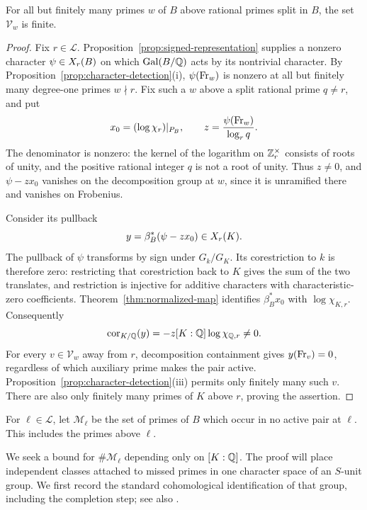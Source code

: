 \begin{lemma}\label{lem:finite-fibers}
For all but finitely many primes $w$ of $B$ above rational primes split in $B$, the set $\mathcal V_w$ is finite.
\end{lemma}
\begin{proof}
Fix $r\in\mathcal L$. Proposition~\ref{prop:signed-representation} supplies a nonzero character $\psi\in X_{r}(B)$ on which $\operatorname{Gal}(B/\mathbb Q)$ acts by its nontrivial character. By Proposition~\ref{prop:character-detection}(i), $\psi(\operatorname{Fr}_w)$ is nonzero at all but finitely many degree-one primes $w\nmid r$. Fix such a $w$ above a split rational prime $q\ne r$, and put
\[
 x_0=(\log\chi_r)|_{P_B},\qquad
 z=\frac{\psi(\operatorname{Fr}_w)}{\log_r q}.
\]
The denominator is nonzero: the kernel of the logarithm on $\mathbb Z_r^\times$ consists of roots of unity, and the positive rational integer $q$ is not a root of unity. Thus $z\ne0$, and $\psi-zx_0$ vanishes on the decomposition group at $w$, since it is unramified there and vanishes on Frobenius.

Consider its pullback
\[
 y=\beta_B^*(\psi-zx_0)\in X_{r}(K).
\]
The pullback of $\psi$ transforms by sign under $G_k/G_K$. Its corestriction to $k$ is therefore zero: restricting that corestriction back to $K$ gives the sum of the two translates, and restriction is injective for additive characters with characteristic-zero coefficients. Theorem~\ref{thm:normalized-map} identifies $\beta_B^*x_0$ with $\log\chi_{K,r}$. Consequently
\[
 \operatorname{cor}_{K/\mathbb Q}(y)
 =-z[K:\mathbb Q]\log\chi_{\mathbb Q,r}\ne0.
\]
For every $v\in\mathcal V_w$ away from $r$, decomposition containment gives $y(\operatorname{Fr}_v)=0$, regardless of which auxiliary prime makes the pair active. Proposition~\ref{prop:character-detection}(iii) permits only finitely many such $v$. There are also only finitely many primes of $K$ above $r$, proving the assertion.
\end{proof}

For $\ell\in\mathcal L$, let $\mathcal M_\ell$ be the set of primes of $B$ which occur in no active pair at $\ell$. This includes the primes above $\ell$.

We seek a bound for $\#\mathcal M_\ell$ depending only on $[K:\mathbb Q]$. The proof will place independent classes attached to missed primes in one character space of an $S$-unit group. We first record the standard cohomological identification of that group, including the completion step; see also \cite{neukirch1999}.

